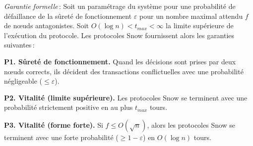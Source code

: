 \documentclass[a4,twocolumn,10pt]{article}
\newcommand{\Oh}[1]{O(#1)}
\theoremstyle{definition}
\begin{document}
\emph{Garantie formelle}\,: Soit un paramétrage du système pour une probabilité de défaillance de la sûreté de fonctionnement $\varepsilon$ pour un nombre maximal attendu $f$ de nœuds antagonistes. Soit $\Oh{\log n} < t_{max} < \infty$ la limite supérieure de l'exécution du protocole. Les protocoles Snow fournissent alors les garanties suivantes\,:
\begin{compactitem}

     \item \textbf{P1. Sûreté de fonctionnement.} Quand les décisions sont prises par deux nœuds corrects, ils décident des transactions conflictuelles avec une probabilité négligeable ($\leq \varepsilon$).
     \item \textbf{P2. Vitalité (limite supérieure).} Les protocoles Snow se terminent avec une probabilité strictement positive en au plus $t_{max}$ tours.
     \item \textbf{P3. Vitalité (forme forte).} Si $f \leq \Oh{\sqrt{n}}$, alors les protocoles Snow se terminent avec une forte probabilité ($\geq 1 - \varepsilon$) en $\Oh{\log{n}}$ tours.
\end{compactitem}
\end{document}
